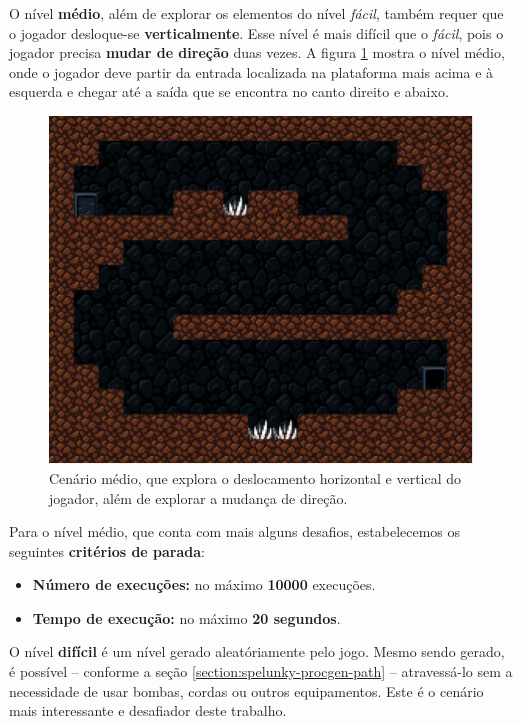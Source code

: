 O nível \textbf{médio}, além de explorar os elementos do nível \textit{fácil},
também requer que o jogador desloque-se \textbf{verticalmente}. Esse nível é
mais difícil que o \textit{fácil}, pois o jogador precisa \textbf{mudar de
direção} duas vezes. A figura \ref{fig:level2} mostra o nível médio, onde o
jogador deve partir da entrada localizada na plataforma mais acima e à
esquerda e chegar até a saída que se encontra no canto direito e abaixo.

\begin{figure}[H]
\centering
\includegraphics[width=\textwidth / 2]{fig/levels/level2.pdf}
\caption{Cenário médio, que explora o deslocamento horizontal e vertical do
    jogador, além de explorar a mudança de direção.}
\label{fig:level2}
\end{figure}

Para o nível médio, que conta com mais alguns desafios, estabelecemos os
seguintes \textbf{critérios de parada}:

\begin{itemize}
	\item \textbf{Número de execuções:} no máximo \textbf{10000} execuções.
	\item \textbf{Tempo de execução:} no máximo \textbf{20 segundos}.
\end{itemize}

O nível \textbf{difícil} é um nível gerado aleatóriamente pelo jogo. Mesmo sendo
gerado, é possível -- conforme a seção \ref{section:spelunky-procgen-path} --
atravessá-lo sem a necessidade de usar bombas, cordas ou outros equipamentos.
Este é o cenário mais interessante e desafiador deste trabalho.

